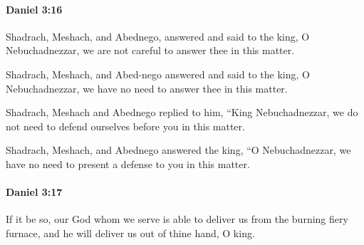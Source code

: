 		\paragraph{Daniel 3:16} %
			\label{DANIEL-3-16}

			Shadrach, Meshach, and Abednego, answered and said to the king, O Nebuchadnezzar, we are not careful to answer thee in this matter.

			\begin{versebox}
					\item[BHS] 
					\item[LXX] 
					\item[ASV] Shadrach, Meshach, and Abed-nego answered and said to the king, O Nebuchadnezzar, we have no need to answer thee in this matter.
					\item[NIV] Shadrach, Meshach and Abednego replied to him, “King Nebuchadnezzar, we do not need to defend ourselves before you in this matter.
					\item[NRSV] Shadrach, Meshach, and Abednego answered the king, “O Nebuchadnezzar, we have no need to present a defense to you in this matter.
			\end{versebox}

		\paragraph{Daniel 3:17} %
			\label{DANIEL-3-17}

			If it be so, our God whom we serve is able to deliver us from the burning fiery furnace, and he will deliver us out of thine hand, O king.

